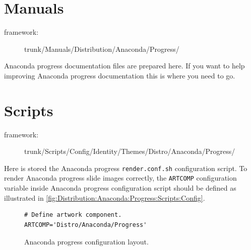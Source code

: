     \section{Manuals}
\hypertarget{sec:Distribution:Anaconda:Progress:Manuals}{}
      \label{sec:Distribution:Anaconda:Progress:Manuals}

\begin{description}
\item[framework:] trunk/Manuals/Distribution/Anaconda/Progress/
\end{description}

\noindent Anaconda progress documentation files are prepared here.  If
you want to help improving Anaconda progress documentation this is
where you need to go.

    \section{Scripts}
\hypertarget{sec:Distribution:Anaconda:Progress:Scripts}{}
      \label{sec:Distribution:Anaconda:Progress:Scripts}

\begin{description}
\item[framework:] trunk/Scripts/Config/Identity/Themes/Distro/Anaconda/Progress/
\end{description}

\noindent Here is stored the Anaconda progress \texttt{render.conf.sh}
configuration script.  To render Anaconda progress slide images
correctly, the \texttt{ARTCOMP} configuration variable inside Anaconda
progress configuration script should be defined as illustrated in
\autoref{fig:Distribution:Anaconda:Progress:Scripts:Config}. 

\begin{figure}
\hrulefill
\begin{verbatim}
# Define artwork component.
ARTCOMP='Distro/Anaconda/Progress'
\end{verbatim}
\hrulefill
\caption{Anaconda progress configuration layout.%
   \label{fig:Distribution:Anaconda:Progress:Scripts:Config}}
\end{figure}

